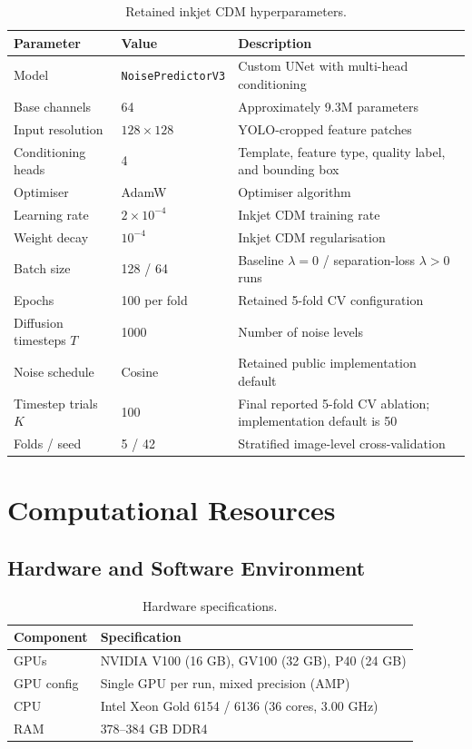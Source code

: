 \begin{table}[htbp]
  \centering
  \caption{Retained inkjet CDM hyperparameters.}
  \label{tab:appC:inkjet}
  \footnotesize
  \begin{tabular}{@{}llp{7.5cm}@{}}
    \toprule
    Parameter & Value & Description \\
    \midrule
    Model & \texttt{NoisePredictorV3} & Custom UNet with multi-head conditioning \\
    Base channels & 64 & Approximately 9.3M parameters \\
    Input resolution & $128 \times 128$ & YOLO-cropped feature patches \\
    Conditioning heads & 4 & Template, feature type, quality label, and bounding box \\
    Optimiser & AdamW & Optimiser algorithm \\
    Learning rate & $2 \times 10^{-4}$ & Inkjet CDM training rate \\
    Weight decay & $10^{-4}$ & Inkjet CDM regularisation \\
    Batch size & 128 / 64 & Baseline $\lambda=0$ / separation-loss $\lambda>0$ runs \\
    Epochs & 100 per fold & Retained 5-fold CV configuration \\
    Diffusion timesteps $T$ & 1000 & Number of noise levels \\
    Noise schedule & Cosine & Retained public implementation default \\
    Timestep trials $K$ & 100 & Final reported 5-fold CV ablation; implementation default is 50 \\
    Folds / seed & 5 / 42 & Stratified image-level cross-validation \\
    \bottomrule
  \end{tabular}
\end{table}

\section{Computational Resources}
\label{app:experimental-config:resources}

\subsection{Hardware and Software Environment}
\label{app:experimental-config:resources:hw}

\begin{table}[htbp]
  \centering
  \caption{Hardware specifications.}
  \label{tab:appC:hardware}
  \begin{tabular}{lp{10cm}}
    \toprule
    Component & Specification \\
    \midrule
    GPUs & NVIDIA V100 (16 GB), GV100 (32 GB), P40 (24 GB) \\
    GPU config & Single GPU per run, mixed precision (AMP) \\
    CPU & Intel Xeon Gold 6154 / 6136 (36 cores, 3.00 GHz) \\
    RAM & 378--384 GB DDR4 \\
    \bottomrule
  \end{tabular}
\end{table}

